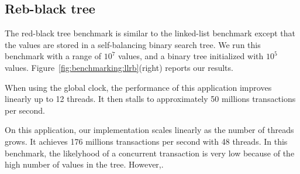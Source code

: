 \subsection{Reb-black tree}

The red-black tree benchmark is similar to the linked-list benchmark except that the values are stored in a self-balancing binary search tree. 
We run this benchmark with a range of $10^7$ values, and a binary tree initialized with $10^5$ values.
Figure~\ref{fig:benchmarking:llrb}(right) reports our results.

When using the global clock, the performance of this application improves linearly up to 12 threads. 
It then stalls to approximately 50 millions transactions per second.

On this application, our implementation scales linearly as the number of threads grows. 
It achieves 176 millions transactions per second with 48 threads.
%
In this benchmark, the likelyhood of a concurrent transaction is very low because of the high number of values in the tree. However,.
%
